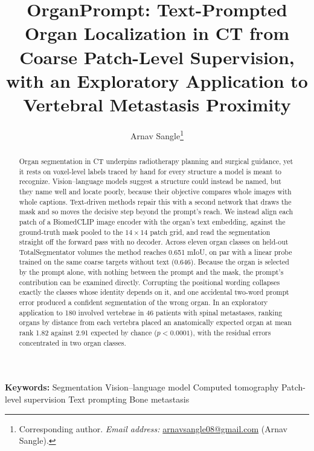 \documentclass[10pt]{article}
\title{\bfseries OrganPrompt: Text-Prompted Organ Localization in CT from Coarse Patch-Level Supervision, with an Exploratory Application to Vertebral Metastasis Proximity}
\author[a]{Arnav Sangle\thanks{Corresponding author.
\textit{Email address:}
\href{mailto:arnavsangle08@gmail.com}{arnavsangle08@gmail.com} (Arnav Sangle).}}
\affil[a]{\small Ranchview High School, 8401 East Valley Ranch Parkway, Irving,
TX 75063, United States}
\date{}
\begin{document}
\maketitle

\begin{abstract}
Organ segmentation in CT underpins radiotherapy planning and surgical guidance,
yet it rests on voxel-level labels traced by hand for every structure a model is
meant to recognize. Vision--language models suggest a structure could instead be
named, but they name well and locate poorly, because their objective compares
whole images with whole captions. Text-driven methods repair this with a second
network that draws the mask and so moves the decisive step beyond the prompt's
reach. We instead align each patch of a BiomedCLIP image encoder with the organ's
text embedding, against the ground-truth mask pooled to the $14\times14$ patch
grid, and read the segmentation straight off the forward pass with no decoder.
Across eleven organ classes on held-out TotalSegmentator volumes the method
reaches 0.651 mIoU, on par with a linear probe trained on the same coarse targets
without text (0.646). Because the organ is selected by the prompt alone, with
nothing between the prompt and the mask, the prompt's contribution can be
examined directly. Corrupting the positional wording collapses exactly the classes whose
identity depends on it, and one accidental two-word prompt error produced a
confident segmentation of the wrong organ. In an exploratory application to 180
involved vertebrae in 46 patients with spinal metastases, ranking organs by
distance from each vertebra placed an anatomically expected organ at mean rank
1.82 against 2.91 expected by chance ($p<0.0001$), with the residual errors
concentrated in two organ classes.
\end{abstract}

\begin{center}
\begin{minipage}{0.86\textwidth}
{\small\noindent\textbf{Keywords:} Segmentation \textperiodcentered{}
Vision--language model \textperiodcentered{} Computed tomography
\textperiodcentered{} Patch-level supervision \textperiodcentered{} Text prompting
\textperiodcentered{} Bone metastasis}
\end{minipage}
\end{center}
\end{document}
